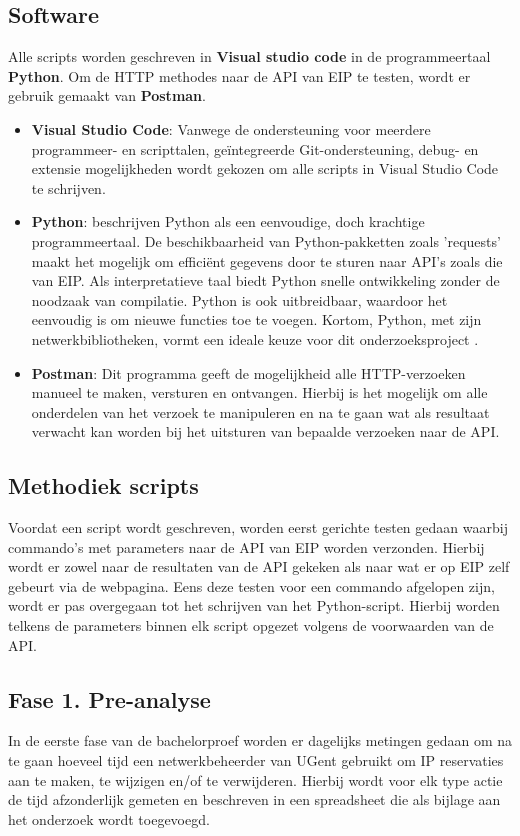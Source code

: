 \documentclass{hogent-article}
\begin{document}
\subsection{Software}
Alle scripts worden geschreven in \textbf{Visual studio code} in de programmeertaal \textbf{Python}.
Om de HTTP methodes naar de API van EIP te testen, wordt er gebruik gemaakt van \textbf{Postman}.
\begin{itemize}
    \item \textbf{Visual Studio Code}: Vanwege de ondersteuning voor meerdere programmeer- en scripttalen, geïntegreerde Git-ondersteuning, debug- en extensie mogelijkheden wordt gekozen om alle scripts in Visual Studio Code te schrijven.
    \item \textbf{Python}: \textcite{VanRossum2011} beschrijven Python als een eenvoudige, doch krachtige programmeertaal. De beschikbaarheid van Python-pakketten zoals ’requests’ maakt het mogelijk om efficiënt gegevens door te sturen naar API’s zoals die van EIP. Als interpretatieve taal biedt Python snelle ontwikkeling zonder de noodzaak van compilatie. Python is ook uitbreidbaar, waardoor het eenvoudig is om nieuwe functies toe te voegen. Kortom, Python, met zijn netwerkbibliotheken, vormt een ideale keuze voor dit onderzoeksproject \autocite{VanRossum2011}.
    \item \textbf{Postman}: Dit programma geeft de mogelijkheid alle HTTP-verzoeken manueel te maken, versturen en ontvangen. Hierbij is het mogelijk om alle onderdelen van het verzoek te manipuleren en na te gaan wat als resultaat verwacht kan worden bij het uitsturen van bepaalde verzoeken naar de API.
\end{itemize}

\subsection{Methodiek scripts}
Voordat een script wordt geschreven, worden eerst gerichte testen gedaan waarbij commando's met parameters naar de API van EIP worden verzonden. Hierbij wordt er zowel naar de resultaten van de API gekeken als naar wat er op EIP zelf gebeurt via de webpagina. Eens deze testen voor een commando afgelopen zijn, wordt er pas overgegaan tot het schrijven van het Python-script. Hierbij worden telkens de parameters binnen elk script opgezet volgens de voorwaarden van de API.

\subsection{Fase 1. Pre-analyse}
In de eerste fase van de bachelorproef worden er dagelijks metingen gedaan om na te gaan hoeveel tijd een netwerkbeheerder van UGent gebruikt om IP reservaties aan te maken, te wijzigen en/of te verwijderen. Hierbij wordt voor elk type actie de tijd afzonderlijk gemeten en beschreven in een spreadsheet die als bijlage aan het onderzoek wordt toegevoegd.
\end{document}
